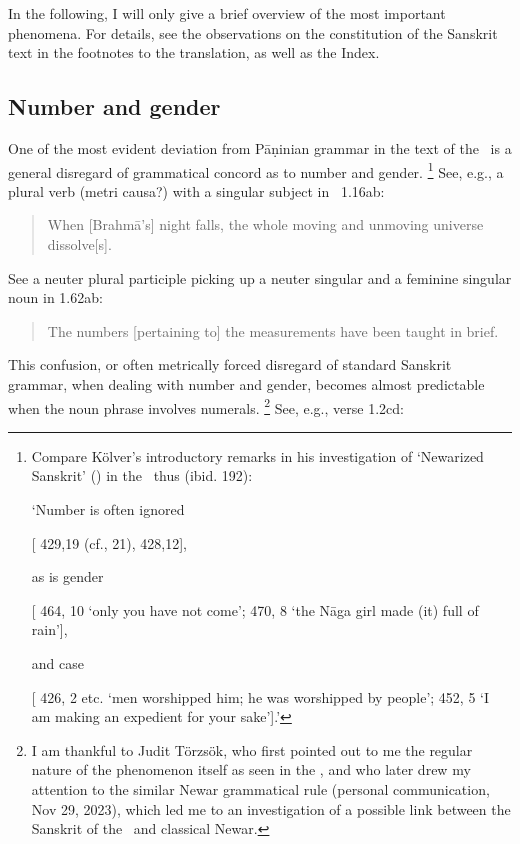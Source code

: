 In the following, I will only give a brief overview of the most
important phenomena. For details, see the observations 
on the constitution of the Sanskrit text in the footnotes 
to the translation, as well as the Index.


\subsection{Number and gender}
One of the most evident deviation from Pāṇinian grammar in 
the text of the \VSS\ is a general disregard of grammatical concord 
as to number and gender.%
	\footnote{Compare Kölver's introductory remarks in
				   his investigation of `Newarized Sanskrit' ()
					in the \SvayP\ thus (ibid. 192):
					
					\noindent
	          	`Number is often ignored
	          	
					[ 429,19 (cf., 21), 
					 428,12],
					
					\noindent
					as is gender
					
			[ 464, 10 `only you have not come’; 
			 470, 8 
					`the Nāga girl made (it) full of rain'],
				
				\noindent
				and case
				
				[ 426, 2 etc. 
				`men worshipped him; he was worshipped by people'; 
				 452, 5 
				`I am making an expedient for your sake'].'}
See, e.g., a plural verb
(metri causa?) with a singular subject in \VSS\ 1.16ab:

\begin{quote}

When [Brahmā's] night falls, the whole moving and unmoving universe dissolve[s].
\end{quote}

\noindent
See a neuter plural participle picking up a 
neuter singular and a feminine singular noun in 1.62ab:

\begin{quote}

The numbers [pertaining to] the measurements have been taught in brief.
\end{quote}

\noindent
This confusion, or often metrically forced disregard of standard Sanskrit
grammar, when dealing with number and gender, becomes almost
predictable when the noun phrase involves numerals.%
    \footnote{I am thankful to Judit Törzsök, who first pointed out to me
    the regular nature of the phenomenon itself as seen in the \VSS, and who 
    later drew my attention to the similar Newar grammatical rule
    (personal communication, Nov 29, 2023), which 
    led me to an investigation of a possible link between the Sanskrit of the \VSS\
    and classical Newar.}
See, e.g., verse 1.2cd:



